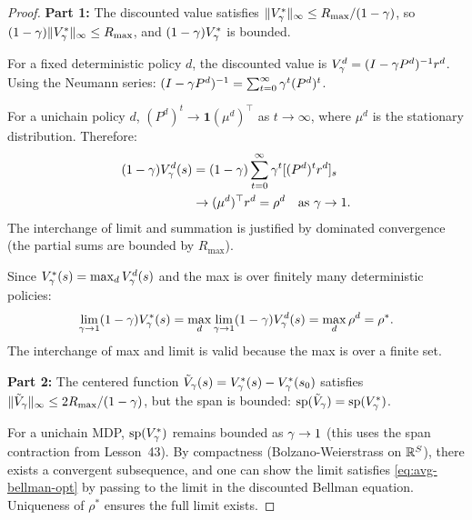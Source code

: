 \documentclass[11pt,a4paper]{article}
\begin{document}
\begin{proof}
\textbf{Part 1:} The discounted value satisfies
$\|V^*_\gamma\|_\infty \leq R_{\max}/(1-\gamma)$, so
$(1-\gamma)\|V^*_\gamma\|_\infty \leq R_{\max}$, and
$(1-\gamma)V^*_\gamma$ is bounded.

For a fixed deterministic policy $d$, the discounted value is
$V^d_\gamma = (I - \gamma P^d)^{-1} r^d$. Using the
Neumann series:
$(I - \gamma P^d)^{-1} = \sum_{t=0}^{\infty} \gamma^t
(P^d)^t$.

For a unichain policy $d$, $(P^d)^t \to \mathbf{1}(\mu^d)^\top$
as $t \to \infty$, where $\mu^d$ is the stationary distribution.
Therefore:
\begin{align*}
    (1-\gamma) V^d_\gamma(s)
    &= (1-\gamma) \sum_{t=0}^{\infty} \gamma^t
    [(P^d)^t r^d]_s \\
    &\to (\mu^d)^\top r^d = \rho^d
    \quad \text{as } \gamma \to 1.
\end{align*}
The interchange of limit and summation is justified by dominated
convergence (the partial sums are bounded by $R_{\max}$).

Since $V^*_\gamma(s) = \max_d V^d_\gamma(s)$ and the max
is over finitely many deterministic policies:
\begin{align*}
    \lim_{\gamma \to 1} (1-\gamma) V^*_\gamma(s)
    = \max_d \lim_{\gamma \to 1} (1-\gamma) V^d_\gamma(s)
    = \max_d \rho^d = \rho^*.
\end{align*}
The interchange of max and limit is valid because the max is over a
finite set.

\textbf{Part 2:} The centered function
$\tilde{V}_\gamma(s) = V^*_\gamma(s) -
V^*_\gamma(s_0)$ satisfies $\|\tilde{V}_\gamma\|_\infty
\leq 2R_{\max}/(1-\gamma)$, but the span is bounded:
$\mathrm{sp}(\tilde{V}_\gamma) = \mathrm{sp}(V^*_\gamma)$.

For a unichain MDP, $\mathrm{sp}(V^*_\gamma)$ remains bounded
as $\gamma \to 1$ (this uses the span contraction from
Lesson~43). By compactness (Bolzano-Weierstrass on $\mathbb{R}^S$), there
exists a convergent subsequence, and one can show the limit satisfies
\eqref{eq:avg-bellman-opt} by passing to the limit in the discounted
Bellman equation. Uniqueness of $\rho^*$ ensures the full limit
exists.
\end{proof}
\end{document}
